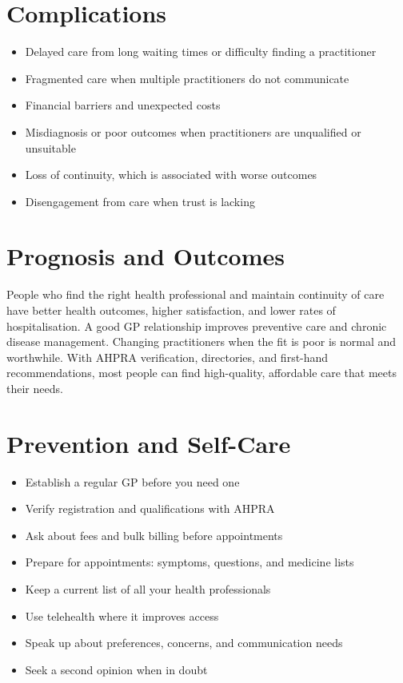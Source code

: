 \section*{Complications}
\begin{itemize}
    \item Delayed care from long waiting times or difficulty finding a practitioner
    \item Fragmented care when multiple practitioners do not communicate
    \item Financial barriers and unexpected costs
    \item Misdiagnosis or poor outcomes when practitioners are unqualified or unsuitable
    \item Loss of continuity, which is associated with worse outcomes
    \item Disengagement from care when trust is lacking
\end{itemize}

\section*{Prognosis and Outcomes}
People who find the right health professional and maintain continuity of care have better health outcomes, higher satisfaction, and lower rates of hospitalisation. A good GP relationship improves preventive care and chronic disease management. Changing practitioners when the fit is poor is normal and worthwhile. With AHPRA verification, directories, and first-hand recommendations, most people can find high-quality, affordable care that meets their needs.

\section*{Prevention and Self-Care}
\begin{itemize}
    \item Establish a regular GP before you need one
    \item Verify registration and qualifications with AHPRA
    \item Ask about fees and bulk billing before appointments
    \item Prepare for appointments: symptoms, questions, and medicine lists
    \item Keep a current list of all your health professionals
    \item Use telehealth where it improves access
    \item Speak up about preferences, concerns, and communication needs
    \item Seek a second opinion when in doubt
\end{itemize}

